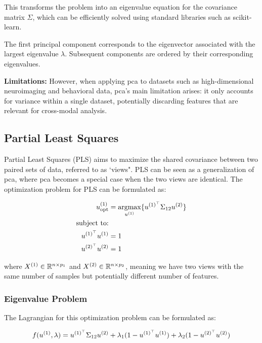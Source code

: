 This transforms the problem into an eigenvalue equation for the covariance matrix \(\Sigma\), which can be efficiently solved using standard libraries such as scikit-learn\citep{pedregosa2011scikit}.

The first principal component corresponds to the eigenvector associated with the largest eigenvalue \(\lambda\). Subsequent components are ordered by their corresponding eigenvalues.

\textbf{Limitations: }However, when applying \acrshort{pca} to datasets such as high-dimensional neuroimaging and behavioral
data, \acrshort{pca}'s main limitation arises: it only accounts for variance within a single dataset, potentially discarding features that are relevant for cross-modal analysis.

\subsection{Partial Least Squares}

Partial Least Squares (PLS)\citep{wold1975path} aims to maximize the shared covariance between two paired sets of data, referred to as `views". PLS can be seen as a generalization of \acrshort{pca}, where \acrshort{pca} becomes a special case when the two views are identical. The optimization problem for PLS can be formulated as:

\begin{align}
     u^{(1)}_{\text{opt}} &= \underset{u^{(1)}}{\mathrm{argmax}} \{ u^{(1)^{\top}} \Sigma_{12} u^{(2)} \} \\
     \text{subject to:} \notag \\
     u^{(1)^{\top}}u^{(1)} &= 1 \notag \\
     u^{(2)^{\top}}u^{(2)} &= 1 \notag
\end{align}

where \( X^{(1)} \in \mathbb{R}^{n \times p_1} \) and \( X^{(2)} \in \mathbb{R}^{n \times p_2} \), meaning we have two views with the same number of samples but potentially different number of features.

\subsubsection{Eigenvalue Problem}

The Lagrangian for this optimization problem can be formulated as:

\begin{equation}
f(u^{(1)}, \lambda) = u^{(1)^{\top}} \Sigma_{12} u^{(2)} + \lambda_1 (1 - u^{(1)^{\top}}u^{(1)}) + \lambda_2 (1 - u^{(2)^{\top}}u^{(2)})
\end{equation}

